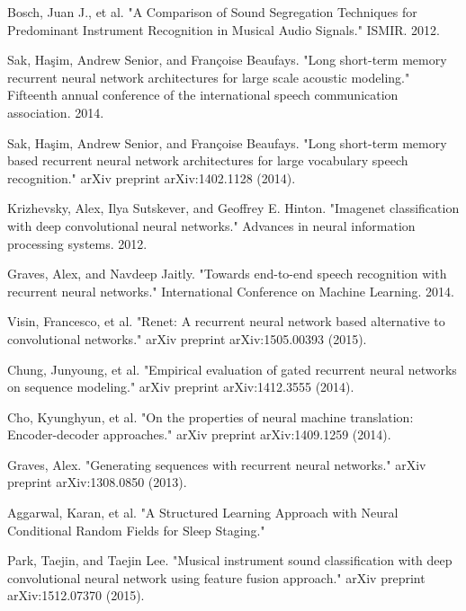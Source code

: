 \documentclass[letterpaper, 10 pt, conference]{ieeeconf}  %
\begin{document}
\begin{thebibliography}{99}

 Bosch, Juan J., et al. "A Comparison of Sound Segregation Techniques for Predominant Instrument Recognition in Musical Audio Signals." ISMIR. 2012.

 Sak, Haşim, Andrew Senior, and Françoise Beaufays. "Long short-term memory recurrent neural network architectures for large scale acoustic modeling." Fifteenth annual conference of the international speech communication association. 2014.

 Sak, Haşim, Andrew Senior, and Françoise Beaufays. "Long short-term memory based recurrent neural network architectures for large vocabulary speech recognition." arXiv preprint arXiv:1402.1128 (2014).

 Krizhevsky, Alex, Ilya Sutskever, and Geoffrey E. Hinton. "Imagenet classification with deep convolutional neural networks." Advances in neural information processing systems. 2012.

 Graves, Alex, and Navdeep Jaitly. "Towards end-to-end speech recognition with recurrent neural networks." International Conference on Machine Learning. 2014.

 Visin, Francesco, et al. "Renet: A recurrent neural network based alternative to convolutional networks." arXiv preprint arXiv:1505.00393 (2015).

 Chung, Junyoung, et al. "Empirical evaluation of gated recurrent neural networks on sequence modeling." arXiv preprint arXiv:1412.3555 (2014).

 Cho, Kyunghyun, et al. "On the properties of neural machine translation: Encoder-decoder approaches." arXiv preprint arXiv:1409.1259 (2014).

 Graves, Alex. "Generating sequences with recurrent neural networks." arXiv preprint arXiv:1308.0850 (2013).

 Aggarwal, Karan, et al. "A Structured Learning Approach with Neural Conditional Random Fields for Sleep Staging."

 Park, Taejin, and Taejin Lee. "Musical instrument sound classification with deep convolutional neural network using feature fusion approach." arXiv preprint arXiv:1512.07370 (2015).


\end{thebibliography}
\end{document}
